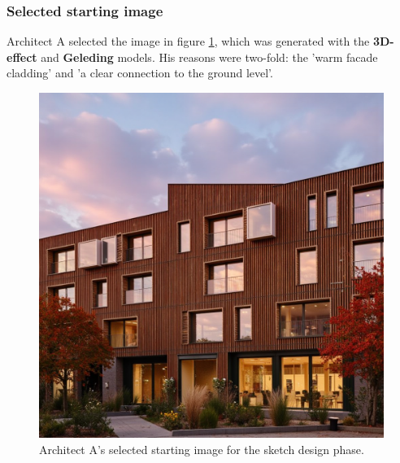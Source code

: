 \subsubsection{Selected starting image}
Architect A selected the image in figure \ref{fig:A-sketch-selected}, which was generated with the \textbf{3D-effect} and \textbf{Geleding} models. His reasons were two-fold: the 'warm facade cladding' and 'a clear connection to the ground level'.
\begin{figure}[H]
    \centering
    \includegraphics[width=0.3\linewidth]{Images/Methodology/Evaluation sessions/DMOA_Fixed-images/1-sketch_design/Met_lora_00043_ (1).png}
    \caption{Architect A's selected starting image for the sketch design phase.}
    \label{fig:A-sketch-selected}
\end{figure}

